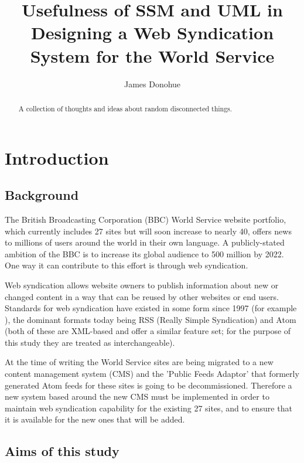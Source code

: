 \documentclass{article}
\begin{document}
\title{Usefulness of SSM and UML in Designing a Web Syndication System for the World Service}
\author{James Donohue}

\maketitle

\begin{abstract}
A collection of thoughts and ideas about random disconnected things.
\end{abstract}

\section{Introduction}
\subsection{Background}

The British Broadcasting Corporation (BBC) World Service website portfolio, which currently includes 27 sites but will soon increase to nearly 40, offers news to millions of users around the world in their own language. A publicly-stated\cite{bbc2013} ambition of the BBC is to increase its global audience to 500 million by 2022. One way it can contribute to this effort is through web syndication.

Web syndication allows website owners to publish information about new or changed content in a way that can be reused by other websites or end users. Standards for web syndication have existed in some form since 1997 (for example \cite{w3c1997}), the dominant formats today being RSS (Really Simple Syndication) and Atom (both of these are XML-based and offer a similar feature set; for the purpose of this study they are treated as interchangeable).

At the time of writing the World Service sites are being migrated to a new content management system (CMS) and the 'Public Feeds Adaptor' that formerly generated Atom feeds for these sites is going to be decommissioned. Therefore a new system based around the new CMS must be implemented in order to maintain web syndication capability for the existing 27 sites, and to ensure that it is available for the new ones that will be added.

\subsection{Aims of this study}
\end{document}
